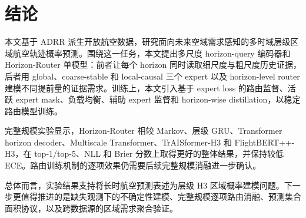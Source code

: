 \section{结论}

本文基于 ADRR 派生开放航空数据，研究面向未来空域需求感知的多时域层级区域航空轨迹概率预测。围绕这一任务，本文提出多尺度 horizon-query 编码器和 Horizon-Router 单模型：前者让每个 horizon 同时读取细尺度与粗尺度历史证据，后者用 global、coarse-stable 和 local-causal 三个 expert 以及 horizon-level router 建模不同提前量的证据需求。训练上，本文引入基于 expert loss 的路由监督、活跃 expert mask、负载均衡、辅助 expert 监督和 horizon-wise distillation，以稳定路由模型训练。

完整规模实验显示，Horizon-Router 相较 Markov、层级 GRU、Transformer horizon decoder、Multiscale Transformer、TrAISformer-H3 和 FlightBERT++-H3，在 top-1/top-5、NLL 和 Brier 分数上取得更好的整体结果，并保持较低 ECE。路由训练机制的逐项效果仍需要后续完整规模消融进一步确认。

总体而言，实验结果支持将长时航空预测表述为层级 H3 区域概率建模问题。下一步更值得推进的是缺失观测下的不确定性建模、完整规模逐项路由消融、预测集合面积协议，以及跨数据源的区域需求聚合验证。
